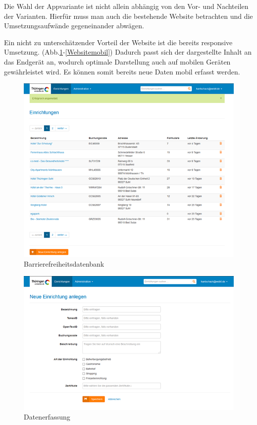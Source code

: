 Die Wahl der Appvariante ist nicht allein abhängig von den Vor- und Nachteilen der Varianten. Hierfür muss man auch die bestehende Website betrachten und die Umsetzungsaufwände gegeneinander abwägen.

Ein nicht zu unterschätzender Vorteil der Website ist die bereits responsive Umsetzung. (Abb.\ref{Barrierefreidatenbank}-\ref{Websitemobil}) Dadurch passt sich der dargestellte Inhalt an das Endgerät an, wodurch optimale Darstellung auch auf mobilen Geräten gewährleistet wird. Es können somit bereits neue Daten mobil erfasst werden.

\begin{figure}[htb]
	\includegraphics[width=\textwidth]{Bilder/Barrierefreidatenbank}
	\caption{Barrierefreiheitsdatenbank}
	\label{Barrierefreidatenbank}
\end{figure}

\begin{figure}[htb]
	\includegraphics[width=\textwidth]{Bilder/Datenerfassung}
	\caption{Datenerfassung}
	\label{Datenerfassung}
\end{figure}

